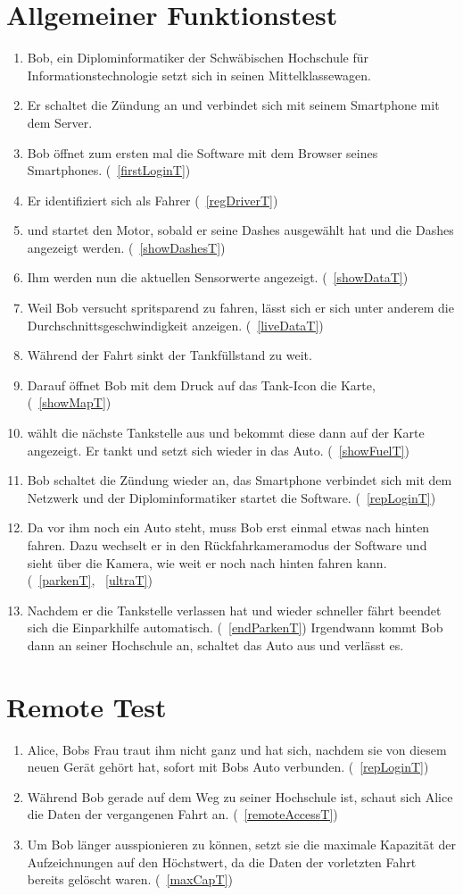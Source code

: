 \documentclass[pflichtenheft.tex]{subfiles}
\begin{document}
\section{Allgemeiner Funktionstest}
\begin{enumerate}
\item
Bob, ein Diplominformatiker der Schwäbischen Hochschule für Informationstechnologie setzt sich in seinen Mittelklassewagen. 
\item
Er schaltet die Zündung an und verbindet sich mit seinem Smartphone mit dem Server. 
\item
Bob öffnet  zum ersten mal die Software mit dem Browser seines Smartphones.  (~\ref{firstLoginT})
\item
Er identifiziert sich als Fahrer (~\ref{regDriverT})
\item
und startet den Motor, sobald er seine Dashes ausgewählt hat und die Dashes angezeigt werden. (~\ref{showDashesT})
\item
Ihm werden nun die aktuellen Sensorwerte angezeigt. (~\ref{showDataT})
\item
Weil Bob versucht spritsparend zu fahren, lässt sich er sich unter anderem die Durchschnittsgeschwindigkeit anzeigen. (~\ref{liveDataT})
\item
Während der Fahrt sinkt der Tankfüllstand zu weit.
\item
 Darauf öffnet Bob mit dem Druck auf das Tank-Icon die Karte, (~\ref{showMapT})
\item
wählt die nächste Tankstelle aus und bekommt diese dann auf der Karte angezeigt. Er tankt und setzt sich wieder in das Auto. (~\ref{showFuelT})
\item
Bob schaltet die Zündung wieder an, das Smartphone verbindet sich mit dem Netzwerk und der Diplominformatiker startet die Software. (~\ref{repLoginT})
\item
Da vor ihm noch ein Auto steht, muss Bob erst einmal etwas nach hinten fahren. Dazu wechselt er in den Rückfahrkameramodus der Software und sieht über die Kamera, wie weit er noch nach hinten fahren kann. (~\ref{parkenT}, ~\ref{ultraT})
\item
Nachdem er die Tankstelle verlassen hat und wieder schneller fährt beendet sich die Einparkhilfe automatisch. (~\ref{endParkenT}) Irgendwann kommt Bob dann an seiner Hochschule an, schaltet das Auto aus und verlässt es. 
\end{enumerate}
\section{Remote Test}
\begin{enumerate}
  \item 
  Alice, Bobs Frau traut ihm nicht ganz und hat sich, nachdem sie von diesem neuen Gerät gehört hat, sofort mit Bobs Auto verbunden. (~\ref{repLoginT})
  \item  Während Bob gerade auf dem Weg zu seiner Hochschule ist, schaut sich Alice die Daten der vergangenen Fahrt an. (~\ref{remoteAccessT})
  \item Um Bob länger ausspionieren zu können, setzt sie die maximale Kapazität der Aufzeichnungen auf den Höchstwert, da die Daten der vorletzten Fahrt bereits gelöscht waren. (~\ref{maxCapT})
\end{enumerate}
\end{document}
